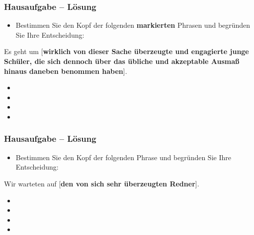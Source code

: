 \begin{frame}
\frametitle{Hausaufgabe -- Lösung} 

\begin{itemize}
	\item Bestimmen Sie den Kopf der folgenden \textbf{markierten} Phrasen und begründen Sie Ihre Entscheidung:
\end{itemize}
	
	\ea Es geht um [\textbf{wirklich von dieser Sache überzeugte und engagierte junge Schüler, die sich dennoch über das übliche und akzeptable Ausmaß hinaus daneben benommen haben}].
	\z

\pause 

	
\begin{itemize}
	\item {}
	\item {}
	\item {}
	\item {}
\end{itemize}

	
\end{frame}


\begin{frame}
\frametitle{Hausaufgabe -- Lösung} 

\begin{itemize}
	\item Bestimmen Sie den Kopf der folgenden Phrase und begründen Sie Ihre Entscheidung:
\end{itemize}

\ea Wir warteten auf [\textbf{den von sich sehr überzeugten Redner}].
\z 

\pause 

\begin{itemize}
	\item {}
	\item {}
	\item {}
	\item {}
\end{itemize}
	
	
\end{frame}


